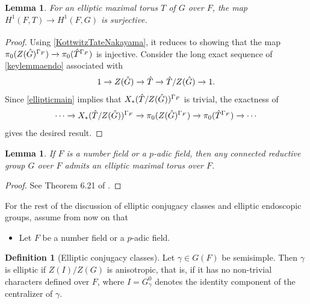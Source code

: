 \documentclass[11pt,a4paper]{article}
\theoremstyle{definition}
\newtheorem{D}[shared]{Definition}
\theoremstyle{plain}
\newtheorem{Le}[shared]{Lemma}
\theoremstyle{remark}
\theoremstyle{plain}
\begin{document}
\begin{Le}\label{elliptictemp}
For an elliptic maximal torus $T$ of $G$ over $F$, the map $H^1(F,T) \xrightarrow[]{} H^1(F,G)$ is surjective.
\end{Le}
\begin{proof}
    Using \ref{KottwitzTateNakayama}, it reduces to showing that the map $\pi_0(Z(\Hat{G})^{\Gamma_F}) \xrightarrow[]{} \pi_0(\Hat{T}^{\Gamma_F})$ is injective. Consider the long exact sequence of \ref{keylemmaendo} associated with
    $$ 1 \xrightarrow[]{} Z(\Hat{G}) \xrightarrow[]{} \Hat{T} \xrightarrow[]{} \Hat{T}/Z(\Hat{G}) \xrightarrow[]{} 1.$$
    Since \ref{ellipticmain} implies that $X_*(\Hat{T}/Z(\Hat{G}))^{\Gamma_F}$ is trivial, the exactness of 
    $$ \cdots \xrightarrow[]{} X_*(\Hat{T}/Z(\Hat{G}))^{\Gamma_F} \xrightarrow[]{} \pi_0(Z(\Hat{G})^{\Gamma_F}) \xrightarrow[]{} \pi_0(\Hat{T}^{\Gamma_F}) \xrightarrow[]{} \cdots$$
    gives the desired result.
\end{proof}

\begin{Le}
    If $F$ is a number field or a $p$-adic field, then any connected reductive group $G$ over $F$ admits an elliptic maximal torus over $F$.
\end{Le}
\begin{proof}
    See Theorem 6.21 of \cite{MR4615820}.
\end{proof}

For the rest of the discussion of elliptic conjugacy classes and elliptic endoscopic groups, assume from now on that
\begin{itemize}
    \item Let $F$ be a number field or a $p$-adic field.
\end{itemize}

\begin{D}[Elliptic conjugacy classes]\label{ellipticdef}
    Let $\gamma \in G(F)$ be semisimple. Then $\gamma$ is elliptic if $Z(I) / Z(G)$ is anisotropic, that is, if it has no non-trivial characters defined over $F$, where $I = G_{\gamma}^0$ denotes the identity component of the centralizer of $\gamma$.
\end{D}
\end{document}
